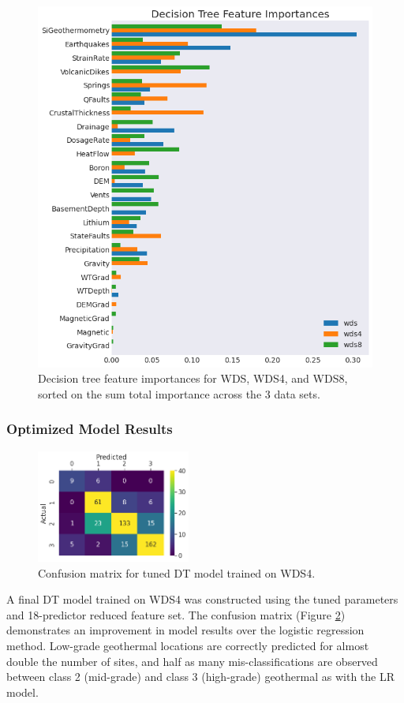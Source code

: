 \begin{figure}[!htp]
\centering
\includegraphics[width=\textwidth]{templates/images/Figure-DT_feature_importances_all.png}
\caption[Decision tree feature importances]{Decision tree feature importances for WDS, WDS4, and WDS8, sorted on the sum total importance across the 3 data sets.}
\label{fig:dtree_feat_import}
\end{figure}

\subsubsection{Optimized Model Results}
\begin{figure}[!htp]
\centering
\includegraphics[width=0.45\textwidth]{templates/images/Figure-DT-ConfusionMatrix.png}
\singlespacing
\caption[Decision tree confusion matrix]{Confusion matrix for tuned DT model trained on WDS4.}
\label{fig:dtree_conf_matrix}
\end{figure}
A final DT model trained on WDS4 was constructed using the tuned parameters and 18-predictor reduced feature set. The confusion matrix (Figure \ref{fig:dtree_conf_matrix}) demonstrates an improvement in model results over the logistic regression method. Low-grade geothermal locations are correctly predicted for almost double the number of sites, and half as many mis-classifications are observed between class 2 (mid-grade) and class 3 (high-grade) geothermal as with the LR model.

